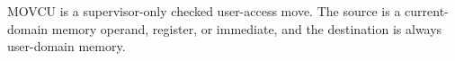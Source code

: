 MOVCU is a supervisor-only checked user-access move. The source is a current-domain memory operand, register, or immediate, and the destination is always user-domain memory.
